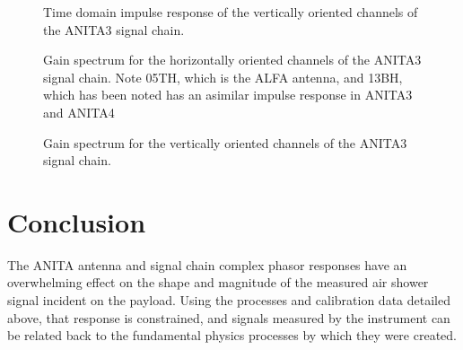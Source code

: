 \begin{figure}
\centering
{}
	\caption{Time domain impulse response of the vertically oriented channels of the ANITA3 signal chain.}
\label{fig:tf_timeV}
\end{figure}

\begin{figure}
\centering
{}
	\caption{Gain spectrum for the horizontally oriented channels of the ANITA3 signal chain.  Note 05TH, which is the ALFA antenna, and 13BH, which has been noted has an asimilar impulse response in ANITA3 and ANITA4}
\label{fig:tf_fftH}
\end{figure}

\begin{figure}
\centering
{}
	\caption{Gain spectrum for the vertically oriented channels of the ANITA3 signal chain.}
\label{fig:tf_fftV}
\end{figure}


\section{Conclusion}
	The ANITA antenna and signal chain complex phasor responses have an overwhelming effect on the shape and magnitude of the measured air shower signal incident on the payload.  Using the processes and calibration data detailed above, that response is constrained, and signals measured by the instrument can be related back to the fundamental physics processes by which they were created.
	
